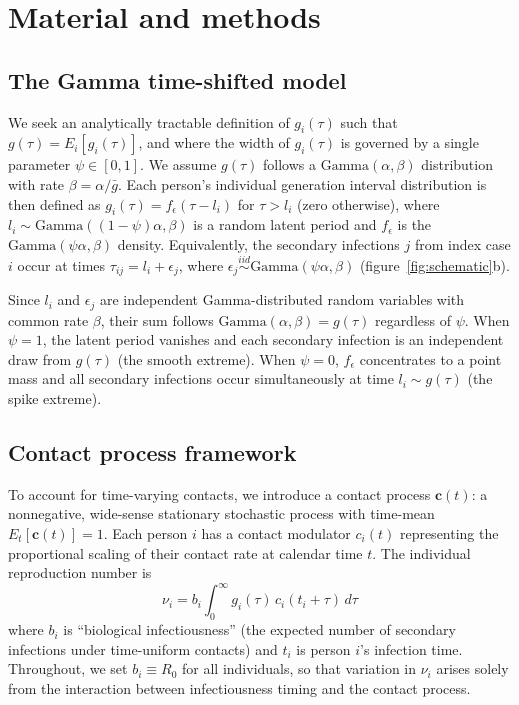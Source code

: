 \documentclass[10pt]{article}
\begin{document}

\section{Material and methods}

\subsection{The Gamma time-shifted model}

We seek an analytically tractable definition of $g_i(\tau)$ such that $g(\tau) = E_i[g_i(\tau)]$, and where the width of $g_i(\tau)$ is governed by a single parameter $\psi \in [0,1]$. We assume $g(\tau)$ follows a $\text{Gamma}(\alpha, \beta)$ distribution with rate $\beta = \alpha / \bar{g}$. Each person's individual generation interval distribution is then defined as $g_i(\tau) = f_\epsilon(\tau - l_i)$ for $\tau > l_i$ (zero otherwise), where $l_i \sim \text{Gamma}((1-\psi)\alpha, \beta)$ is a random latent period and $f_\epsilon$ is the $\text{Gamma}(\psi\alpha, \beta)$ density. Equivalently, the secondary infections $j$ from index case $i$ occur at times $\tau_{ij} = l_i + \epsilon_j$, where $\epsilon_j \overset{iid}{\sim} \text{Gamma}(\psi\alpha, \beta)$ (figure~\ref{fig:schematic}b).

Since $l_i$ and $\epsilon_j$ are independent Gamma-distributed random variables with common rate $\beta$, their sum follows $\text{Gamma}(\alpha, \beta) = g(\tau)$ regardless of $\psi$. When $\psi = 1$, the latent period vanishes and each secondary infection is an independent draw from $g(\tau)$ (the smooth extreme). When $\psi = 0$, $f_\epsilon$ concentrates to a point mass and all secondary infections occur simultaneously at time $l_i \sim g(\tau)$ (the spike extreme).

\subsection{Contact process framework}

To account for time-varying contacts, we introduce a contact process $\mathbf{c}(t)$: a nonnegative, wide-sense stationary stochastic process with time-mean $E_t[\mathbf{c}(t)] = 1$. Each person $i$ has a contact modulator $c_i(t)$ representing the proportional scaling of their contact rate at calendar time $t$. The individual reproduction number is
\begin{equation}
	\nu_i = b_i \int_0^\infty g_i(\tau) \, c_i(t_i + \tau) \, d\tau
	\label{eq:nu_contacts}
\end{equation}
where $b_i$ is ``biological infectiousness'' (the expected number of secondary infections under time-uniform contacts) and $t_i$ is person $i$'s infection time. Throughout, we set $b_i \equiv R_0$ for all individuals, so that variation in $\nu_i$ arises solely from the interaction between infectiousness timing and the contact process.
\end{document}
